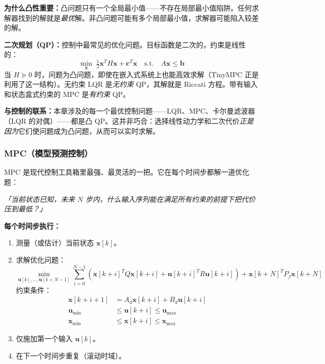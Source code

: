 \textbf{为什么凸性重要：}凸问题只有一个全局最小值——不存在局部最小值陷阱。任何求解器找到的解就是\textit{最优}解。非凸问题可能有多个局部最小值，求解器可能陷入较差的解。

\textbf{二次规划（QP）：}控制中最常见的优化问题。目标函数是二次的，约束是线性的：
\[
\min_{\mathbf{x}} \; \tfrac{1}{2}\mathbf{x}^T H \mathbf{x} + \mathbf{c}^T \mathbf{x} \quad \text{s.t.} \quad A\mathbf{x} \leq \mathbf{b}
\]
当 $H \succeq 0$ 时，问题为凸问题，即使在嵌入式系统上也能高效求解（TinyMPC 正是利用了这一结构）。无约束 LQR 是\textit{无约束} QP，其解就是 Riccati 方程。带有输入和状态盒式约束的 MPC 是\textit{有约束} QP。

\textbf{与控制的联系：}本章涉及的每一个最优控制问题——LQR、MPC、卡尔曼滤波器（LQR 的对偶）——都是凸 QP。这并非巧合：选择线性动力学和二次代价\textit{正是因为}它们使问题成为凸问题，从而可以实时求解。

\subsubsection{MPC（模型预测控制）}

MPC 是现代控制工具箱里最强、最灵活的一把。它在每个时间步都解一道优化题：

\textit{「当前状态已知，未来 $N$ 步内，什么输入序列能在满足所有约束的前提下把代价压到最低？」}

\textbf{每个时间步执行：}
\begin{enumerate}
    \item 测量（或估计）当前状态 $\mathbf{x}[k]$。
    \item 求解优化问题：
    \begin{equation}
    \min_{\mathbf{u}[k], \ldots, \mathbf{u}[k+N-1]} \sum_{i=0}^{N-1} \left( \mathbf{x}[k+i]^T Q \mathbf{x}[k+i] + \mathbf{u}[k+i]^T R \mathbf{u}[k+i] \right) + \mathbf{x}[k+N]^T P_f \mathbf{x}[k+N]
    \end{equation}
    约束条件：
    \begin{align}
    \mathbf{x}[k+i+1] &= A_d \mathbf{x}[k+i] + B_d \mathbf{u}[k+i] \\
    \mathbf{u}_{\min} &\leq \mathbf{u}[k+i] \leq \mathbf{u}_{\max} \\
    \mathbf{x}_{\min} &\leq \mathbf{x}[k+i] \leq \mathbf{x}_{\max}
    \end{align}
    \item 仅施加第一个输入 $\mathbf{u}[k]$。
    \item 在下一个时间步重复（滚动时域）。
\end{enumerate}

